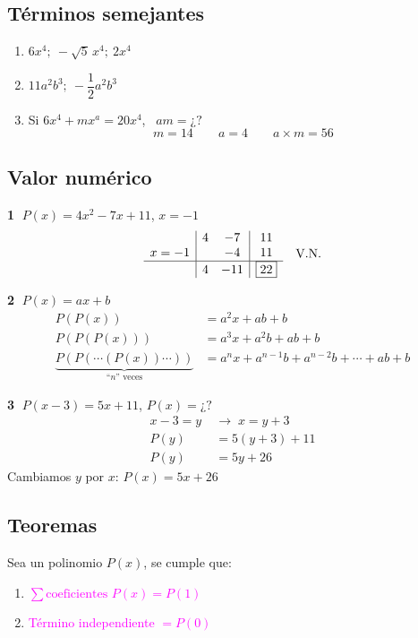 \documentclass[11pt,a4paper]{article}
\begin{document}
\subsection*{Términos semejantes}
\begin{enumerate}[label=\alph*)]
  \item $6x^4;\ -\sqrt{5}\,x^4;\ 2x^4$
  \item $11a^2b^3;\ -\dfrac{1}{2}a^2b^3$
  \item Si $6x^4 + mx^a = 20x^4$, \ $am = \text{¿?}$
  \[ m = 14 \qquad a = 4 \qquad a\times m = 56 \]
\end{enumerate}

\subsection*{Valor numérico}

\textbf{\textcircled{1}} $P(x) = 4x^2 - 7x + 11$, \quad $x = -1$
\[
\begin{array}{c|cc|c}
       & 4 & -7  & 11 \\
x = -1 &   & -4  & 11 \\ \hline
       & 4 & -11 & \boxed{22}
\end{array}
\quad \text{V.N.}
\]

\textbf{\textcircled{2}} $P(x) = ax + b$
\begin{align*}
P(P(x)) &= a^2x + ab + b\\
P(P(P(x))) &= a^3x + a^2b + ab + b\\
\underbrace{P(P(\cdots(P(x))\cdots))}_{\text{``$n$'' veces}} &= a^nx + a^{n-1}b + a^{n-2}b + \cdots + ab + b
\end{align*}

\textbf{\textcircled{3}} $P(x-3) = 5x + 11$, \quad $P(x) = \text{¿?}$
\begin{align*}
x - 3 = y \;&\rightarrow\; x = y + 3\\
P(y) &= 5(y+3) + 11\\
P(y) &= 5y + 26
\end{align*}
\textcolor{azul}{Cambiamos $y$ por $x$:} \quad $P(x) = 5x + 26$


\subsection*{Teoremas}
Sea un polinomio $P(x)$, se cumple que:
\begin{enumerate}[label=\Roman*.]
  \item \textcolor{magenta}{$\sum \text{coeficientes } P(x) = P(1)$}
  \item \textcolor{magenta}{Término independiente $= P(0)$}
\end{enumerate}
\end{document}
